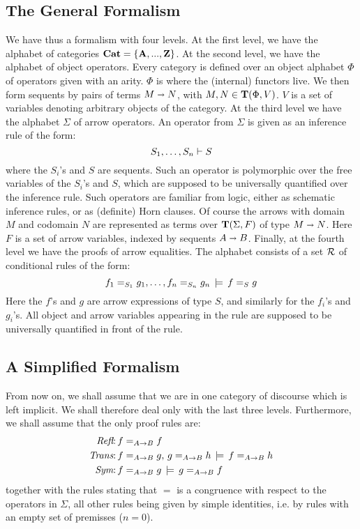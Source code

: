 \subsection{The General Formalism}

We have thus a formalism with four levels. At the first level, we have the alphabet of categories
${\mathbf {Cat}}= \{{\mathbf {A}},...,{\mathbf {Z}}\}$. At the second level, we have the alphabet of object operators. Every category
is defined over an object alphabet $\Phi$ of operators given with an arity. $\Phi$ is where the (internal)
functors live. We then form sequents by pairs of terms $ M \shortrightarrow N$, with $M,N \in {\mathbf {T}}(\Phi,V)$. $V$ is a set
of variables denoting arbitrary objects of the category. At the third level we have the alphabet $\Sigma$
of arrow operators. An operator from $\Sigma$ is given as an inference rule of the form:
\[
S_1,\dots,S_n \vdash S
\]
where the $S_i$’s and $S$ are sequents. Such an operator is polymorphic over the free variables of the
$S_i$’s and $S$, which are supposed to be universally quantified over the inference rule. Such operators
are familiar from logic, either as schematic inference rules, or as (definite) Horn clauses. Of course
the arrows with domain $M$ and codomain $N$ are represented as terms over ${\mathbf {T}}(\Sigma,F)$ of type $M \shortrightarrow N$.
Here $F$ is a set of arrow variables, indexed by sequents $A\shortrightarrow B$. Finally, at the fourth level we have
the proofs of arrow equalities. The alphabet consists of a set $\cal R$ of conditional rules of the form:
\[
f_{1} =_{S_{1}} g_{1}, \dots, f_{n} =_{S_{n}} g_{n}\, \models \, f =_{S} g
\]
Here the $f$’s and $g$ are arrow expressions of type $S$, and similarly for the $f_i$’s and $g_i$’s. 
All object and arrow variables appearing in the rule are supposed to be universally 
quantified in front of the rule.

\subsection{A Simplified Formalism}
From now on, we shall assume that we are in one category of discourse which is left implicit. We shall therefore deal only with the last three levels. Furthermore, we shall assume that the only proof rules are:
\begin{align*}
\text {{\it Refl}:}\, f&=_{A \rightarrow B} f \\
\text {{\it Trans}:}\, f&=_{A \rightarrow B} g, \, g=_{A \rightarrow B} h\, 
\models\, f=_{A \rightarrow B} h \\
\text {{\it Sym}:}\, f&=_{A \rightarrow B} g \, \models\, g=_{A \rightarrow B} f
\end{align*}
together with the rules stating that $=$ is a congruence with respect to the operators in $\Sigma$, all other rules being given by simple identities, i.e. by rules with an empty set of premisses ($n=0$).

